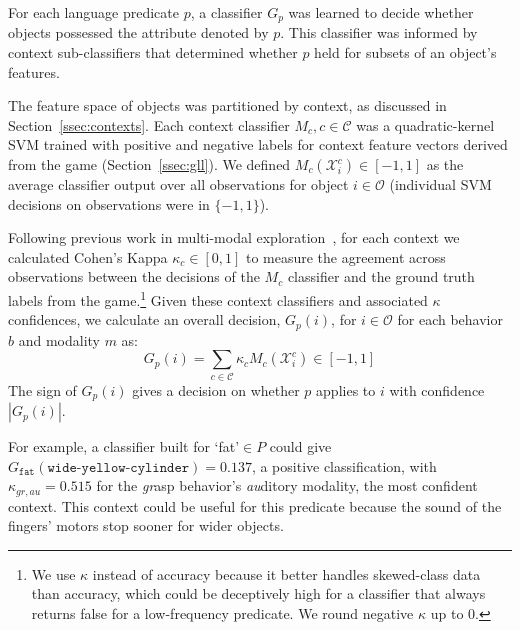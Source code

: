 For each language predicate $p$, a classifier $G_p$ was learned to decide whether objects possessed the attribute denoted by $p$.
This classifier was informed by context sub-classifiers that determined whether $p$ held for subsets of an object's features.

The feature space of objects was partitioned by context, as discussed in Section~\ref{ssec:contexts}.
Each context classifier $M_{c}, c\in\mathcal{C}$ was a quadratic-kernel SVM trained with positive and negative labels for context feature vectors derived from the \ispy game (Section~\ref{ssec:gll}).
We defined $M_{c}(\mathcal{X}_i^c)\in [-1,1]$ as the average classifier output over all observations for object $i\in\mathcal{O}$ (individual SVM decisions on observations were in $\{-1,1\}$).

Following previous work in multi-modal exploration~\cite{sinapov:icra14}, for each context we calculated Cohen's Kappa $\kappa_{c}\in[0,1]$ to measure the agreement across observations between the decisions of the $M_{c}$ classifier and the ground truth labels from the \ispy game.\footnote{We use $\kappa$ instead of accuracy because it better handles skewed-class data than accuracy, which could be deceptively high for a classifier that always returns false for a low-frequency predicate. We round negative $\kappa$ up to $0$.}
Given these context classifiers and associated $\kappa$ confidences, we calculate an overall decision, $G_p(i)$, for $i\in\mathcal{O}$ for each behavior $b$ and modality $m$ as:
\begin{equation}
	G_p(i) = \sum_{c\in\mathcal{C}}{\kappa_{c} M_{c}(\mathcal{X}_i^c)} \in [-1,1]
\end{equation}
The sign of $G_p(i)$ gives a decision on whether $p$ applies to $i$ with confidence $|G_p(i)|$.

For example, a classifier built for `fat'$\in P$ could give $G_{\texttt{fat}}(\texttt{wide-yellow-cylinder}) = 0.137$, a positive classification, with $\kappa_{gr,au}=0.515$ for the \textit{gr}asp behavior's \textit{au}ditory modality, the most confident context. This context could be useful for this predicate because the sound of the fingers' motors stop sooner for wider objects.